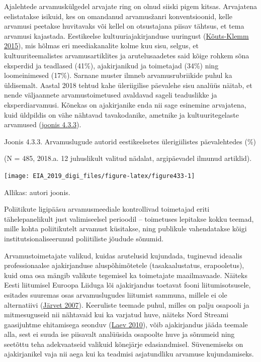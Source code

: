 \documentclass[estonian,]{article}
\begin{document}
Ajalehtede arvamuskülgedel arvajate ring on olnud siiski pigem kitsas. Arvajatena eelistatakse isikuid, kes on omandanud arvamusžanri konventsioonid, kelle arvamusi peetakse huvitavaks või kellel on otsustajana piisav tähtsus, et tema arvamusi kajastada. Eestikeelse kultuuriajakirjanduse uuringust (\protect\hyperlink{Kuxf5uts-Klemm2015}{Kõuts-Klemm 2015}), mis hõlmas eri meediakanalite kolme kuu sisu, selgus, et kultuuriteemalistes arvamusartiklites ja arutelusaadetes said kõige rohkem sõna eksperdid ja teadlased (41\%), ajakirjanikud ja toimetajad (34\%) ning loomeinimesed (17\%). Sarnane muster ilmneb arvamusrubriikide puhul ka üldisemalt. Aastal 2018 tehtud kahe üleriigilise päevalehe sisu analüüs näitab, et nende väljaannete arvamustoimetused avaldavad sageli teaduslikke ja eksperdiarvamusi. Kõnekas on ajakirjanike enda nii sage esinemine arvajatena, kuid üldpildis on vähe nähtavad tavakodanike, ametnike ja kultuuritegelaste arvamused (\protect\hyperlink{figure433}{joonis 4.3.3}).

{Joonis 4.3.3.} Arvamuslugude autorid eestikeelsetes ülerigiilistes päevalehtedes (\%)

(N = 485, 2018.a. 12 juhuslikult valitud nädalat, argipäevadel ilmunud artiklid).

\begin{center}\texttt{[image: EIA\_2019\_digi\_files/figure-latex/figure433-1]} \end{center}

\begin{imgsource}
{Allikas:} autori joonis.
\end{imgsource}

Poliitikute ligipääsu arvamusmeediale kontrollivad toimetajad eriti tähelepanelikult just valimiseelsel perioodil -- toimetuses lepitakse kokku teemad, mille kohta poliitikutelt arvamust küsitakse, ning publikule vahendatakse kõigi institutsionaliseerunud poliitiliste jõudude sõnumid.

Arvamustoimetajate valikud, kuidas arutelusid kujundada, tuginevad ideaalis professionaalse ajakirjanduse aluspõhimõtetele (tasakaalustatus, erapooletus), kuid oma osa mängib valikute tegemisel ka toimetajate maailmavaade. Näiteks Eesti liitumisel Euroopa Liiduga lõi ajakirjandus toetavat fooni liitumisotsusele, esitades suuremas osas arvamuslugudes liitumist sammuna, millele ei ole alternatiivi (\protect\hyperlink{Juxe4rvet2007}{Järvet 2007}). Keeruliste teemade puhul, milles on palju osapooli ja mitmesuguseid nii nähtavaid kui ka varjatud huve, näiteks Nord Streami gaasijuhtme ehitamisega seonduv (\protect\hyperlink{Laev2010}{Laev 2010}), võib ajakirjandus jääda teemale alla, sest ei suuda ise piisavalt analüüsida osapoolte huve ja sõnumeid ning seetõttu teha adekvaatseid valikuid kõnejärje edasiandmisel. Süvenemiseks on ajakirjanikel vaja nii aega kui ka teadmisi asjatundliku arvamuse kujundamiseks.
\end{document}

